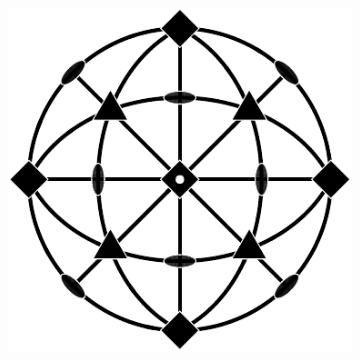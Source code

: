 \documentclass[compress]{beamer}
\begin{document}
\begin{frame}[fragile]
\begin{figure}[H]
\begin{subfigure}{0.3\textwidth}
    \end{subfigure}
    \begin{subfigure}{0.3\textwidth}
      \includegraphics[width=\textwidth]{pic/m-3m}
    \end{subfigure}


\end{figure}
\end{frame}
\end{document}
